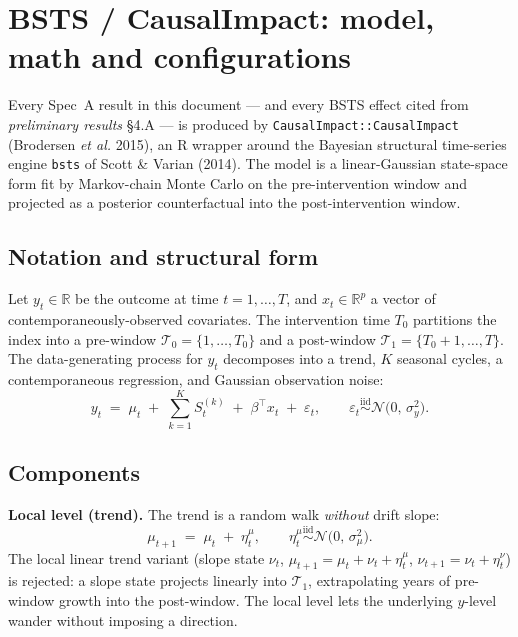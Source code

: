 \documentclass[11pt,a4paper]{article}
\begin{document}
\bigskip

\section*{BSTS / CausalImpact: model, math and configurations}\label{sec:bid_internal:bsts_methods}

\noindent Every Spec~A result in this document --- and every BSTS effect cited from \emph{preliminary results} \S 4.A --- is produced by \texttt{CausalImpact::CausalImpact} (Brodersen \emph{et al.} 2015), an R wrapper around the Bayesian structural time-series engine \texttt{bsts} of Scott \& Varian (2014). The model is a linear-Gaussian state-space form fit by Markov-chain Monte Carlo on the pre-intervention window and projected as a posterior counterfactual into the post-intervention window.

\subsection*{Notation and structural form}

Let $y_t \in \mathbb{R}$ be the outcome at time $t = 1, \dots, T$, and $x_t \in \mathbb{R}^p$ a vector of contemporaneously-observed covariates. The intervention time $T_0$ partitions the index into a pre-window $\mathcal{T}_0 = \{1,\dots,T_0\}$ and a post-window $\mathcal{T}_1 = \{T_0{+}1,\dots,T\}$. The data-generating process for $y_t$ decomposes into a trend, $K$ seasonal cycles, a contemporaneous regression, and Gaussian observation noise:
\begin{equation}
y_t \;=\; \mu_t \;+\; \sum_{k=1}^{K} S_t^{(k)} \;+\; \beta^{\!\top} x_t \;+\; \varepsilon_t,
\qquad \varepsilon_t \stackrel{\text{iid}}{\sim} \mathcal{N}\!\bigl(0,\, \sigma_y^2\bigr).
\label{eq:bsts_dgp}
\end{equation}

\subsection*{Components}

\noindent\textbf{Local level (trend).} The trend is a random walk \emph{without} drift slope:
\begin{equation}
\mu_{t+1} \;=\; \mu_t \;+\; \eta_t^{\mu},
\qquad \eta_t^{\mu} \stackrel{\text{iid}}{\sim} \mathcal{N}\!\bigl(0,\, \sigma_\mu^2\bigr).
\label{eq:local_level}
\end{equation}
The local linear trend variant (slope state $\nu_t$, $\mu_{t+1} = \mu_t + \nu_t + \eta_t^\mu$, $\nu_{t+1} = \nu_t + \eta_t^\nu$) is rejected: a slope state projects linearly into $\mathcal{T}_1$, extrapolating years of pre-window growth into the post-window. The local level lets the underlying $y$-level wander without imposing a direction.
\end{document}
